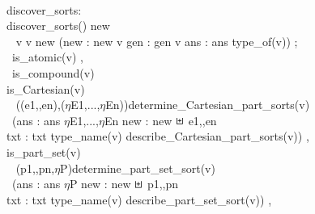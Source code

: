 \pos{\footnotesize\small\normalsize}{\Large}\label{discover-sorts}
\bp
{}\\
 discover\_sorts:  {\RIGHTARROW} \\
 discover\_sorts() {\IS}  new {\NOTEQ} {\LBRACE}{\RBRACE}  \\
\>\  v {\RDOT} v {\ISIN} new  (new :{\EQ} new {\SETMINUS} {\LBRACE}v{\RBRACE} {\PARL} gen :{\EQ} gen {\UNION} {\LBRACE}v{\RBRACE} {\PARL} ans :{\EQ} ans {\SETMINUS} {\LBRACE}type\_of(v){\RBRACE}) ;\\
\>\ is\_atomic(v) {\RIGHTARROW}  ,\\
\>\ is\_compound(v) {\RIGHTARROW}\\
\>\>is\_Cartesian(v) {\RIGHTARROW}\\
\>\>\  ((e1,{\DOTDOTDOT},en),($\eta$E1,...,$\eta$En)){\EQ}determine\_Cartesian\_part\_sorts(v) \\
\>\>\ (ans :{\EQ} ans {\UNION} {\LBRACE}$\eta$E1,...,$\eta$En{\RBRACE} {\PARL} new :{\EQ} new $\sqcupplus$ {\LBRACE}e1,{\DOTDOTDOT},en{\RBRACE}\ \ \\
\>\>\>{\PARL} txt :{\EQ} txt {\UNION} {\LBRACKET}type\_name(v) {\MAPSTO} {\LANGLE}describe\_Cartesian\_part\_sorts(v){\RANGLE}{\RBRACKET}) , \\
\>\>is\_part\_set(v) {\RIGHTARROW}\\
\>\>\  ({\LBRACE}p1,{\DOTDOTDOT},pn{\RBRACE},$\eta$P){\EQ}determine\_part\_set\_sort(v) \\
\>\>\ (ans :{\EQ} ans {\UNION} {\LBRACE}$\eta$P{\RBRACE} {\PARL} new :{\EQ} new $\sqcupplus$ {\LBRACE}p1,{\DOTDOTDOT},pn{\RBRACE} {\PARL}\\
\>\>\>txt :{\EQ} txt {\UNION} {\LBRACKET}type\_name(v) {\MAPSTO} describe\_part\_set\_sort(v){\RBRACKET}) , \\
\> 
\ep
\endboiteepaisseavecuntitre\pos{\normalsize}{\HHHH}\rm
\noindent
\pos{\psno}{\mnewfoil}%

